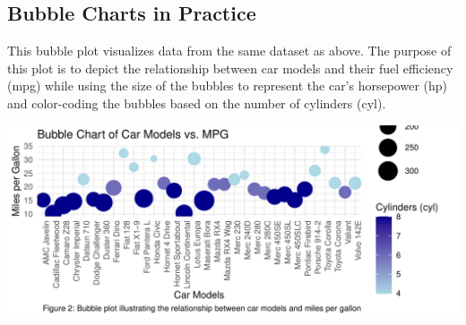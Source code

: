 \documentclass{article}\usepackage[]{graphicx}\usepackage[]{xcolor}
\makeatletter
\def\maxwidth{ %
  \ifdim\Gin@nat@width>\linewidth
    \linewidth
  \else
    \Gin@nat@width
  \fi
}
\newenvironment{knitrout}{}{} %
\makeatother
\begin{document}
\subsection{Bubble Charts in Practice}
 This bubble plot visualizes data from the same dataset as above. The purpose of this plot is to depict the relationship between car models and their fuel efficiency (mpg) while using the size of the bubbles to represent the car's horsepower (hp) and color-coding the bubbles based on the number of cylinders (cyl).

\begin{knitrout}
\color{fgcolor}
\includegraphics[width=\maxwidth]{figure/buble-plot-chunk-1} 
\end{knitrout}
\end{document}
